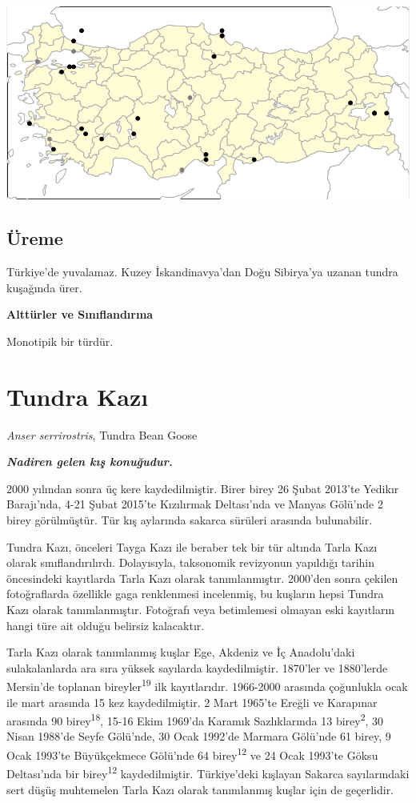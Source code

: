 \documentclass[
  letterpaper,
  DIV=11,
  numbers=noendperiod]{scrreprt}
\begin{document}
\includegraphics[width=6.25in,height=\textheight]{images/harita_Anser_erythropus.png}

\hypertarget{uxfcreme-2}{%
\subsection{\texorpdfstring{\textbf{Üreme}}{Üreme}}\label{uxfcreme-2}}

Türkiye'de yuvalamaz. Kuzey İskandinavya'dan Doğu Sibirya'ya uzanan
tundra kuşağında ürer.

\textbf{Alttürler ve Sınıflandırma}

Monotipik bir türdür.

\hypertarget{tundra-kazux131}{%
\section{Tundra Kazı}\label{tundra-kazux131}}

\emph{Anser serrirostris}, Tundra Bean Goose

\textbf{\emph{Nadiren gelen kış konuğudur.}}

2000 yılından sonra üç kere kaydedilmiştir. Birer birey 26 Şubat 2013'te
Yedikır Barajı'nda, 4-21 Şubat 2015'te Kızılırmak Deltası'nda ve Manyas
Gölü'nde 2 birey görülmüştür. Tür kış aylarında sakarca sürüleri
arasında bulunabilir.

Tundra Kazı, önceleri Tayga Kazı ile beraber tek bir tür altında Tarla
Kazı olarak sınıflandırılırdı. Dolayısıyla, taksonomik revizyonun
yapıldığı tarihin öncesindeki kayıtlarda Tarla Kazı olarak
tanımlanmıştır. 2000'den sonra çekilen fotoğraflarda özellikle gaga
renklenmesi incelenmiş, bu kuşların hepsi Tundra Kazı olarak
tanımlanmıştır. Fotoğrafı veya betimlemesi olmayan eski kayıtların hangi
türe ait olduğu belirsiz kalacaktır.

Tarla Kazı olarak tanımlanmış kuşlar Ege, Akdeniz ve İç Anadolu'daki
sulakalanlarda ara sıra yüksek sayılarda kaydedilmiştir. 1870'ler ve
1880'lerde Mersin'de toplanan bireyler\textsuperscript{19} ilk
kayıtlarıdır. 1966-2000 arasında çoğunlukla ocak ile mart arasında 15
kez kaydedilmiştir. 2 Mart 1965'te Ereğli ve Karapınar arasında 90
birey\textsuperscript{18}, 15-16 Ekim 1969'da Karamık Sazlıklarında 13
birey\textsuperscript{2}, 30 Nisan 1988'de Seyfe Gölü'nde, 30 Ocak
1992'de Marmara Gölü'nde 61 birey, 9 Ocak 1993'te Büyükçekmece Gölü'nde
64 birey\textsuperscript{12} ve 24 Ocak 1993'te Göksu Deltası'nda bir
birey\textsuperscript{12} kaydedilmiştir. Türkiye'deki kışlayan Sakarca
sayılarındaki sert düşüş muhtemelen Tarla Kazı olarak tanımlanmış kuşlar
için de geçerlidir.
\end{document}
